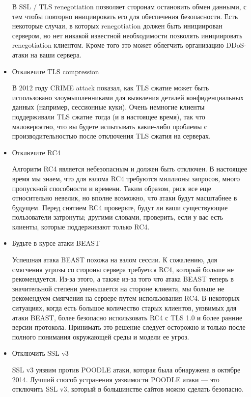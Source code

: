 \documentclass[11pt, a4paper]{article}		%
\begin{document}
\begin{itemize}
В SSL / TLS renegotiation позволяет сторонам остановить обмен данными, с тем чтобы повторно инициировать его для обеспечения безопасности. Есть некоторые случаи, в которых renegotiation должен быть инициирован сервером, но нет никакой известной необходимости позволять инициировать renegotiation клиентом. Кроме того это может облегчить организацию DDoS-атаки на ваши сервера.

\item Отключите TLS compression

В 2012 году CRIME attack показал, как TLS сжатие может быть использовано злоумышленниками для выявления деталей конфиденциальных данных (например, сессионные куки). Очень немногие клиенты поддерживали TLS сжатие тогда (и в настоящее время), так что маловероятно, что вы будете испытывать какие-либо проблемы с производительностью после отключения TLS сжатия на серверах.

\item Отключите RC4

Алгоритм RC4 является небезопасным и должен быть отключен. В настоящее время мы знаем, что для взлома RC4 требуются миллионы запросов, много пропускной способности и времени. Таким образом, риск все еще относительно невелик, но вполне возможно, что атаки будут масштабнее в будущем. Перед снятием RC4 проверьте, будут ли ваши существующие пользователи затронуты; другими словами, проверить, если у вас есть клиенты, которые поддерживают только RC4.

\item Будьте в курсе атаки BEAST

Успешная атака BEAST похожа на взлом сессии. К сожалению, для смягчения угрозы со стороны сервера требуется RC4, который больше не рекомендуется. Из-за этого, а также из-за того что атака BEAST теперь в значительной степени уменьшается на стороне клиента, мы больше не рекомендуем смягчения на сервере путем использования RC4. В некоторых ситуациях, когда есть большое количество старых клиентов, уязвимых для атаки BEAST, более безопасно использовать RC4 с TLS 1.0 и более ранние версии протокола. Принимать это решение следует осторожно и только после полного понимания окружающей среды и модели ее угроз.

\item Отключить SSL v3

SSL v3 уязвим против POODLE атаки, которая была обнаружена в октябре 2014. Лучший способ устранения уязвимости POODLE атаки — это отключить SSL v3, который в большинстве сайтов можно сделать безопасно.

\end{itemize}
\end{document}
